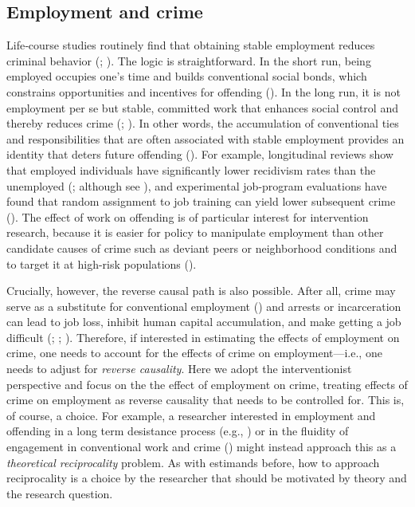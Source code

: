 \documentclass[
  letterpaper,
  DIV=11,
  numbers=noendperiod]{scrartcl}
\begin{document}
\subsection{Employment and crime}\label{employment-and-crime}

Life‐course studies routinely find that obtaining stable employment
reduces criminal behavior (; ). The
logic is straightforward. In the short run, being employed occupies
one's time and builds conventional social bonds, which constrains
opportunities and incentives for offending
(). In the long run, it is
not employment per se but stable, committed work that enhances social
control and thereby reduces crime
(;
). In other words,
the accumulation of conventional ties and responsibilities that are
often associated with stable employment provides an identity that deters
future offending ().
For example, longitudinal reviews show that employed individuals have
significantly lower recidivism rates than the unemployed
(; although see
), and experimental
job‐program evaluations have found that random assignment to job
training can yield lower subsequent crime
(). The effect of
work on offending is of particular interest for intervention research,
because it is easier for policy to manipulate employment than other
candidate causes of crime such as deviant peers or neighborhood
conditions and to target it at high-risk populations
().

Crucially, however, the reverse causal path is also possible. After all,
crime may serve as a substitute for conventional employment
() and arrests or
incarceration can lead to job loss, inhibit human capital accumulation,
and make getting a job difficult
(;
;
). Therefore, if interested in
estimating the effects of employment on crime, one needs to account for
the effects of crime on employment---i.e., one needs to adjust for
\emph{reverse causality}. Here we adopt the interventionist perspective
and focus on the the effect of employment on crime, treating effects of
crime on employment as reverse causality that needs to be controlled
for. This is, of course, a choice. For example, a researcher interested
in employment and offending in a long term desistance process (e.g.,
) or
in the fluidity of engagement in conventional work and crime
() might instead
approach this as a \emph{theoretical reciprocality} problem. As with
estimands before, how to approach reciprocality is a choice by the
researcher that should be motivated by theory and the research question.
\end{document}
